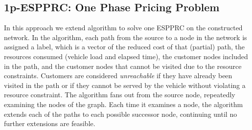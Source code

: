 \subsection{1p-ESPPRC: One Phase Pricing Problem}
\label{1pespprc}
In this approach we extend \citet{Feillet} algorithm to solve one ESPPRC on the constructed 
network. In the \citet{Feillet} algorithm, each path from the source to a node in the network is
assigned a label, which is a vector of the reduced cost of that (partial) path, the resources 
consumed (vehicle load and elapsed time), the customer nodes included in the path, and the 
customer nodes that cannot be visited due to the resource constraints. Customers are 
considered {\em unreachable} if they have already been visited in the path or if they cannot 
be served by the vehicle without violating a resource constraint. The algorithm fans out from 
the source node, repeatedly examining the nodes of the graph. Each time it examines a node, 
the algorithm extends each of the paths to each possible successor node, continuing until no 
further extensions are feasible.

